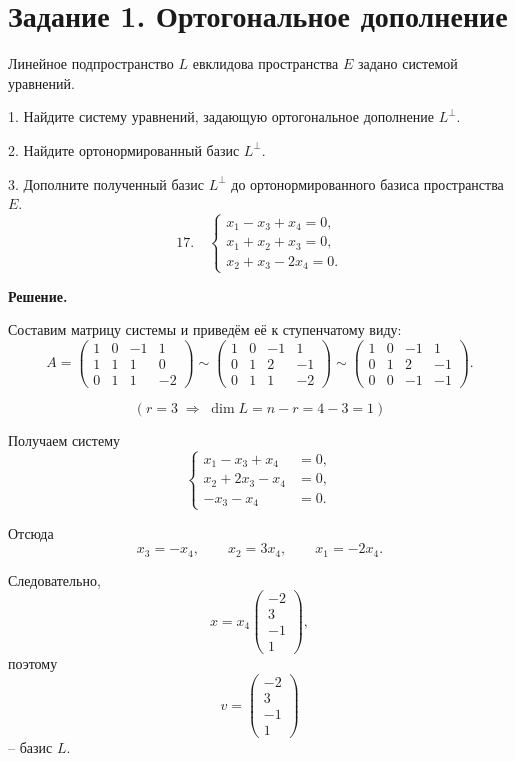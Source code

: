 \section{Задание 1. Ортогональное дополнение}

Линейное подпространство $L$ евклидова пространства $E$ задано системой уравнений.

1. Найдите систему уравнений, задающую ортогональное дополнение $L^\perp$.

2. Найдите ортонормированный базис $L^\perp$.

3. Дополните полученный базис $L^\perp$ до ортонормированного базиса пространства $E$.
\vspace{0.3cm}
\[
17.\quad
\begin{cases}
x_1 - x_3 + x_4 = 0, \\
x_1 + x_2 + x_3 = 0, \\
x_2 + x_3 - 2x_4 = 0.
\end{cases}
\]

\textbf{Решение.}

Составим матрицу системы и приведём её к ступенчатому виду:
\[
A=
\begin{pmatrix}
1 & 0 & -1 & 1\\
1 & 1 & 1 & 0\\
0 & 1 & 1 & -2
\end{pmatrix}
\sim
\begin{pmatrix}
1 & 0 & -1 & 1\\
0 & 1 & 2 & -1\\
0 & 1 & 1 & -2
\end{pmatrix}
\sim
\begin{pmatrix}
1 & 0 & -1 & 1\\
0 & 1 & 2 & -1\\
0 & 0 & -1 & -1
\end{pmatrix}.
\]

\[
(r=3 \;\Rightarrow\; \dim L = n - r = 4 - 3 = 1)
\]

Получаем систему
\[
\left\{
\begin{aligned}
x_1 - x_3 + x_4 &= 0,\\
x_2 + 2x_3 - x_4 &= 0,\\
-x_3 - x_4 &= 0.
\end{aligned}
\right.
\]

Отсюда
\[
x_3=-x_4,\qquad
x_2=3x_4,\qquad
x_1=-2x_4.
\]

Следовательно,
\[
x=
x_4
\begin{pmatrix}
-2\\
3\\
-1\\
1
\end{pmatrix},
\]
поэтому
\[
v=
\begin{pmatrix}
-2\\
3\\
-1\\
1
\end{pmatrix}
\]
-- базис $L$.

